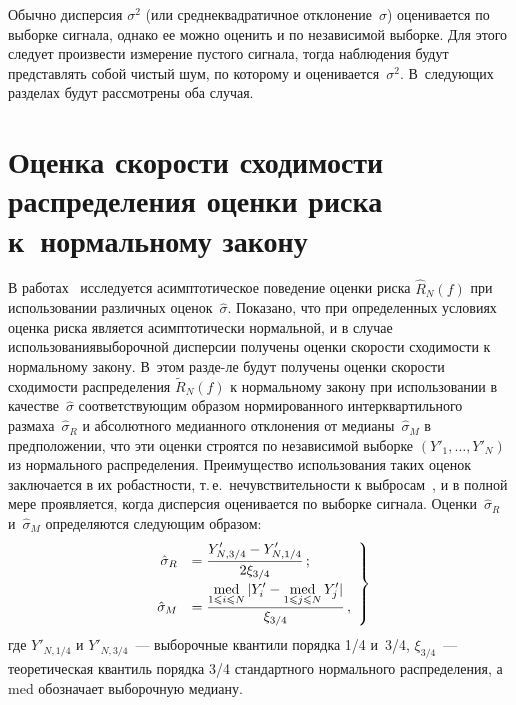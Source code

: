 \begin{multicols}{2}
Обычно дисперсия $\sigma^2$ (или среднеквадратичное отклонение~$\sigma$) оценивается по 
выборке сигнала, однако ее можно оценить и по независимой выборке. Для этого следует 
произвести измерение пустого сигнала, тогда наблюдения будут представлять собой чистый 
шум, по которому и оценивается~$\sigma^2$. В~следующих разделах будут рассмотрены оба случая.

\section{Оценка скорости сходимости распределения оценки риска к~нормальному закону}

В работах~\cite{6sh, 7sh, 8sh} исследуется асимптотическое поведение оценки 
риска $\widehat{R}_N(f)$ при использовании различных оценок~$\hat{\sigma}$. 
Показано, что при определенных условиях оценка риска является асимптотически 
нормальной, и в случае использования\linebreak выборочной дисперсии получены оценки 
ско\-рости сходимости к нормальному закону. В~этом разде-\linebreak ле
 будут получены оценки 
ско\-рости схо\-ди\-мости распределения $\widetilde{R}_N(f)$ к нормальному закону при\linebreak 
использовании в качестве~$\hat{\sigma}$ соответствующим образом нормированного 
интерквартильного размаха~$\hat{\sigma}_{R}$ и абсолютного медианного отклонения 
от медианы~$\hat{\sigma}_{M}$ в предположении, что эти оценки строятся по независимой 
выборке $(Y'_1,\ldots,Y'_N)$ из нормального распределения. Преимущество использования 
таких оценок заключается в их робастности, т.\,е.\ нечувствительности к выбросам~\cite{12sh, 13sh}, 
и в полной мере проявляется, когда дисперсия оценивается по выборке сигнала. 
Оценки~$\hat{\sigma}_{R}$ и~$\hat{\sigma}_{M}$ определяются следующим образом:
\begin{equation}
\left.
\begin{array}{rl}
\hat{\sigma}_{R}&=\displaystyle\frac{\displaystyle Y'_{N,3/4}-Y'_{N,1/4}\mathstrut}{\displaystyle 2\xi_{3/4}\mathstrut}\,;\\[9pt]
\hat{\sigma}_{M}&=\displaystyle\displaystyle\frac{\displaystyle \mathop{\mbox{med}}\limits_{1\leqslant i\leqslant N}|Y'_i-
\mathop{\mbox{med}}\limits_{1\leqslant j\leqslant N} Y'_j|\mathstrut}{\displaystyle \xi_{3/4}\mathstrut}\,,
\end{array}
\right\}
\label{e6sh}
\end{equation}
где $Y'_{N,1/4}$ и $Y'_{N,3/4}$~--- выборочные квантили порядка 1/4 и~3/4, 
$\xi_{3/4}$~--- теоретическая квантиль порядка 3/4 стандартного нормального распределения, 
а med обозначает выборочную медиану.


\end{multicols}
